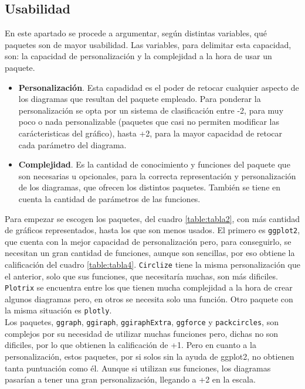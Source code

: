 \documentclass{article}\usepackage[]{graphicx}\usepackage[]{color}
\begin{document}
\subsection{Usabilidad}
En este apartado se procede a argumentar, seg\'un distintas variables, qu\'e paquetes son de mayor usabilidad. Las variables, para delimitar esta capacidad, son: la capacidad de personalizaci\'on y la complejidad a la hora de usar un paquete.
\begin{itemize}
\item \textbf{Personalizaci\'on}. Esta capadidad es el poder de retocar cualquier aspecto de los diagramas que resultan del paquete empleado. Para ponderar la personalizaci\'on se opta por un sistema de clasificaci\'on entre -2, para muy poco o nada personalizable (paquetes que casi no permiten modificar las car\'acteristicas del gr\'afico), hasta +2, para la mayor capacidad de retocar cada par\'ametro del diagrama.
\item \textbf{Complejidad}. Es la cantidad de conocimiento y funciones del paquete que son necesarias u opcionales, para la correcta representaci\'on y personalizaci\'on de los diagramas, que ofrecen los distintos paquetes. Tambi\'en se tiene en cuenta la cantidad de par\'ametros de las funciones.
\end{itemize}
Para empezar se escogen los paquetes, del cuadro \ref{table:tabla2}, con m\'as cantidad de gr\'aficos representados, hasta los que son menos usados. El primero es \texttt{ggplot2}, que cuenta con la mejor capacidad de personalizaci\'on pero, para conseguirlo, se necesitan un gran cantidad de funciones, aunque son sencillas, por eso obtiene la calificaci\'on del cuadro \ref{table:tabla4}. \texttt{Circlize} tiene la misma personalizaci\'on que el anterior, solo que sus funciones, que necesitar\'ia muchas, son m\'as dificiles.
\texttt{Plotrix} se encuentra entre los que tienen mucha complejidad a la hora de crear algunos diagramas pero, en otros se necesita solo una funci\'on. Otro paquete con la misma situaci\'on es \texttt{plotly}.~\\
Los paquetes, \texttt{ggraph}, \texttt{ggiraph}, \texttt{ggiraphExtra}, \texttt{ggforce} y \texttt{packcircles}, son complejos por su necesidad de utilizar muchas funciones pero, dichas no son dificiles, por lo que obtienen la calificaci\'on de +1. Pero en cuanto a la personalizaci\'on, estos paquetes, por si solos sin la ayuda de ggplot2, no obtienen tanta puntuaci\'on como \'el. Aunque si utilizan sus funciones, los diagramas pasar\'ian a tener una gran personalizaci\'on, llegando a +2 en la escala.
\end{document}
